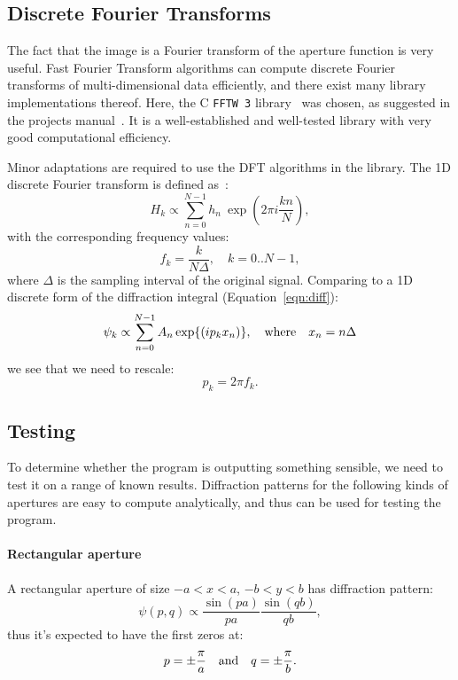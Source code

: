 \documentclass[11pt]{article}
\newcommand{\CC}{{C\nolinebreak[4]\hspace{-.05em}\raisebox{.3ex}{\scriptsize\bf ++}}}
\begin{document}
\subsection{Discrete Fourier Transforms}\label{sec:analysis:dft}
The fact that the image is a Fourier transform of the aperture function is very useful. Fast Fourier Transform algorithms can compute discrete Fourier transforms of multi-dimensional data efficiently, and there exist many library implementations thereof. Here, the \CC{} \texttt{FFTW 3} library~\cite{fftw} was chosen, as suggested in the projects manual~\cite{manual}. It is a well-established and well-tested library with very good computational efficiency.

Minor adaptations are required to use the DFT algorithms in the library. The 1D discrete Fourier transform is defined as~\cite[Chapter 12.1]{NumRecipes}:
\begin{equation}
    H_k \propto \sum_{n=0}^{N-1} h_n\ \exp{\left( 2\pi{}i \frac{kn}{N} \right)},
\end{equation}
with the corresponding frequency values:
\begin{equation}\label{eqn:fk}
    f_k = \frac{k}{N \Delta},\quad k = 0..N-1,
\end{equation}
where $\Delta$ is the sampling interval of the original signal. Comparing to a 1D discrete form of the diffraction integral (Equation~\ref{eqn:diff}):
\begin{equation}
    \psi_k \propto \sum_{n=0}^{N-1} A_n \exp{\left( i p_k x_n \right)}, \qq{where} x_n = n \Delta
\end{equation}
we see that we need to rescale:
\begin{equation}
    p_k = 2\pi f_k.
\end{equation}

\subsection{Testing}\label{sec:analysis:test}
To determine whether the program is outputting something sensible, we need to test it on a range of known results. Diffraction patterns for the following kinds of apertures are easy to compute analytically, and thus can be used for testing the program.

\paragraph{Rectangular aperture} A rectangular aperture of size $-a < x < a$, $-b < y < b$ has diffraction pattern:
\begin{equation}
    \psi(p, q) \propto \frac{\sin{\left( pa \right)}}{pa} \frac{\sin{\left( qb \right)}}{qb},
\end{equation}
thus it's expected to have the first zeros at:
\begin{equation}\label{eqn:test_rect}
    p = \pm \frac{\pi}{a} \qq{and} q = \pm \frac{\pi}{b}.
\end{equation}
\end{document}
